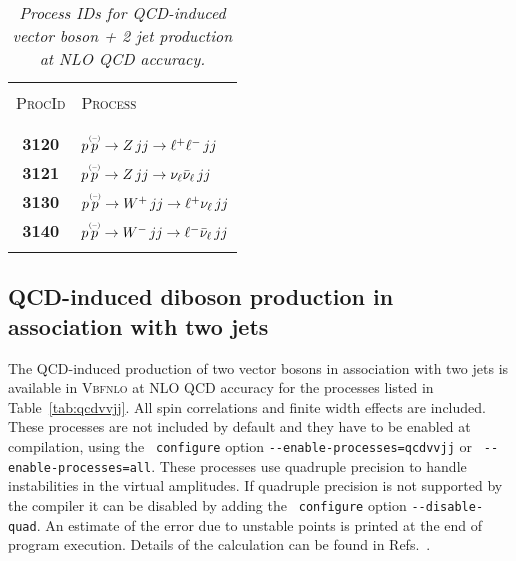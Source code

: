 \documentclass[english,12pt]{article}
\begin{document}
\begin{table}[t!]
\newcommand{\lstrut}{{$\strut\atop\strut$}}
\begin{center}
\small
\begin{tabular}{c|l}
\hline
&\\
\textsc{ProcId} & \textsc{Process}\\
&\\
\hline
&\\
\bf 3120 & $p \overset{\mbox{\tiny{(--)}}}{p} \to Z \,  jj\to \ell^{+} \ell^{-} \, jj$  \\
\bf 3121 & $p \overset{\mbox{\tiny{(--)}}}{p} \to Z \,  jj\to \nu_{\ell} \bar{\nu}_{\ell} \, jj$  \\
\bf 3130 & $p \overset{\mbox{\tiny{(--)}}}{p} \to W^{+} \,  jj\to \ell^{+} \nu_\ell \, jj$ \\
\bf 3140 & $p \overset{\mbox{\tiny{(--)}}}{p} \to W^{-} \, jj\to \ell^{-} \bar{\nu}_\ell  \, jj$\\
&\\
\hline
\end{tabular}
\caption {\em  Process IDs for QCD-induced vector boson + 2 jet production 
at NLO QCD accuracy.}
\vspace{0.2cm}
\label{tab:qcdvjj}
\end{center}
\end{table}



\subsection{QCD-induced diboson production in association with two jets}

%
The QCD-induced production of two vector bosons in association with two
jets is available in \textsc{Vbfnlo} at NLO QCD accuracy for the
processes listed in Table~\ref{tab:qcdvvjj}. All spin correlations and
finite width effects are included. These processes are not included by
default and they have to be enabled at compilation, using the {\tt
configure} option {\tt -{}-enable-processes=qcdvvjj} or {\tt
-{}-enable-processes=all}.  These processes use quadruple precision to
handle instabilities in the virtual amplitudes. If quadruple precision
is not supported by the compiler it can be disabled by adding the {\tt
configure} option {\tt -{}-disable-quad}. An estimate of the error due
to unstable points is printed at the end of program execution. Details
of the calculation can be found in
Refs.~\cite{Campanario:2013qba,Campanario:2013gea,Campanario:2014dpa,
Campanario:2014ioa,Campanario:2014wga,qcdvvjj}.
\end{document}
